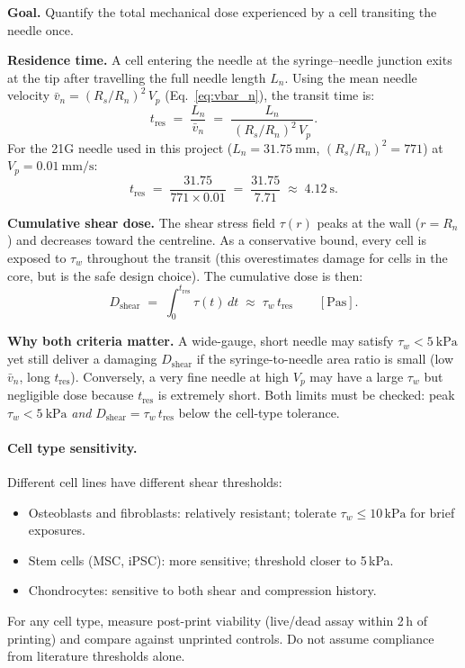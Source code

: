 \documentclass[11pt,a4paper]{article}
\begin{document}
\begin{derivationbox}[title={DERIVATION --- Cumulative shear dose $D_\mathrm{shear}$}]
\textbf{Goal.} Quantify the total mechanical dose experienced by a cell
transiting the needle once.

\medskip
\textbf{Residence time.}
A cell entering the needle at the syringe--needle junction exits at the
tip after travelling the full needle length $L_n$.  Using the mean needle
velocity $\bar v_n = (R_s/R_n)^2\,V_p$ (Eq.~\ref{eq:vbar_n}), the
transit time is:
\begin{equation}
t_\mathrm{res} \;=\; \frac{L_n}{\bar v_n}
               \;=\; \frac{L_n}{\,(R_s/R_n)^2\,V_p\,}.
\label{eq:t_res}
\end{equation}
For the 21G needle used in this project
($L_n=\SI{31.75}{\mm}$, $(R_s/R_n)^2=771$) at
$V_p=\SI{0.01}{\mm\per\s}$:
\[
t_\mathrm{res} \;=\; \frac{31.75}{771\times 0.01}
               \;=\; \frac{31.75}{7.71}
               \;\approx\; \SI{4.12}{\s}.
\]

\medskip
\textbf{Cumulative shear dose.}
The shear stress field $\tau(r)$ peaks at the wall ($r=R_n$) and
decreases toward the centreline.  As a conservative bound, every cell
is exposed to $\tau_w$ throughout the transit (this overestimates
damage for cells in the core, but is the safe design choice).  The
cumulative dose is then:
\begin{equation}
D_\mathrm{shear}
  \;=\; \int_0^{t_\mathrm{res}} \tau(t)\,dt
  \;\approx\; \tau_w\,t_\mathrm{res}
  \qquad [\si{\Pa\s}].
\label{eq:shear_dose}
\end{equation}

\medskip
\textbf{Why both criteria matter.}
A wide-gauge, short needle may satisfy $\tau_w<\SI{5}{\kPa}$ yet still
deliver a damaging $D_\mathrm{shear}$ if the syringe-to-needle area ratio
is small (low $\bar v_n$, long $t_\mathrm{res}$).  Conversely, a very
fine needle at high $V_p$ may have a large $\tau_w$ but negligible dose
because $t_\mathrm{res}$ is extremely short.  Both limits must be
checked: peak $\tau_w<\SI{5}{\kPa}$ \textit{and}
$D_\mathrm{shear}=\tau_w\,t_\mathrm{res}$ below the cell-type tolerance.
\end{derivationbox}

\paragraph{Cell type sensitivity.}
Different cell lines have different shear thresholds:
\begin{itemize}[leftmargin=1.4em,itemsep=2pt]
\item Osteoblasts and fibroblasts: relatively resistant; tolerate
  $\tau_w\leq 10\,\si{\kPa}$ for brief exposures.
\item Stem cells (MSC, iPSC): more sensitive; threshold closer to
  5\,\si{\kPa}.
\item Chondrocytes: sensitive to both shear and compression history.
\end{itemize}
For any cell type, measure post-print viability (live/dead assay within
2\,\si{\hour} of printing) and compare against unprinted controls. Do
not assume compliance from literature thresholds alone.
\end{document}
